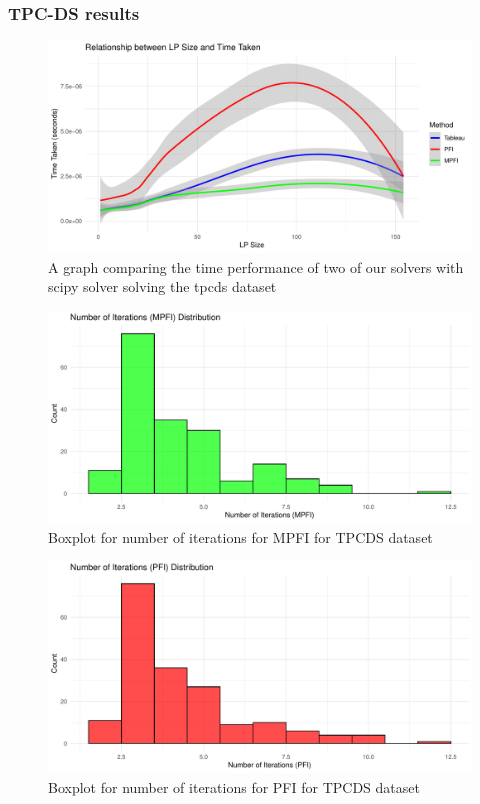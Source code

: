 \subsubsection{TPC-DS results}

\begin{figure}[!htb]
    \centering
    \includegraphics[width=\linewidth]{figures/methods_time_tpcds.pdf}
    \caption{A graph comparing the time performance of two of
    our solvers with scipy solver solving the tpcds dataset}
    \label{fig:methods_time_tpcds}
\end{figure}

\begin{figure}[!htb]
    \centering
    \includegraphics[width=\linewidth]{figures/num_iter_tpcds_mpfi.pdf}
    \caption{Boxplot for number of iterations for MPFI for TPCDS dataset}
    \label{fig:num_iter_tpcds_mpfi}
\end{figure}

\begin{figure}[!htb]
    \centering
    \includegraphics[width=\linewidth]{figures/num_iter_pfi_tpcds.pdf}
    \caption{Boxplot for number of iterations for PFI for TPCDS dataset}
    \label{fig:num_iter_pfi_tpcds}
\end{figure}


